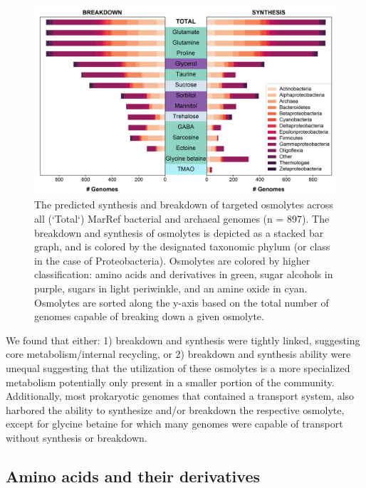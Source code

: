 \documentclass[utf8]{frontiersSCNS} %
\begin{document}
\begin{figure}[t!]    \centering
    \includegraphics[width = 0.9\columnwidth]{Figures/Bacteria-Synthesis-Breakdown-v2021-03-14-01.png}
    \caption{The predicted synthesis and breakdown of targeted osmolytes across all (`Total`) MarRef bacterial and archaeal genomes (n = 897). The breakdown and synthesis of osmolytes is depicted as a stacked bar graph, and is colored by the designated taxonomic phylum (or class in the case of Proteobacteria). Osmolytes are colored by higher classification: amino acids and derivatives in green, sugar alcohols in purple, sugars in light periwinkle, and an amine oxide in cyan. Osmolytes are sorted along the y-axis based on the total number of genomes capable of breaking down a given osmolyte.}
    \label{fig:bact}
\end{figure}

We found that either: 1) breakdown and synthesis were tightly linked, suggesting core metabolism/internal recycling, or 2) breakdown and synthesis ability were unequal suggesting that the utilization of these osmolytes is a more specialized metabolism potentially only present in a smaller portion of the community. Additionally, most prokaryotic genomes that contained a transport system, also harbored the ability to synthesize and/or breakdown the respective osmolyte, except for glycine betaine for which many genomes were capable of transport without synthesis or breakdown.

\subsection{Amino acids and their derivatives}
\end{document}
